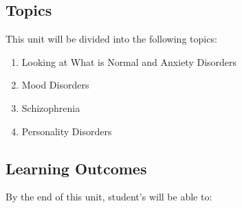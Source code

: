 \documentclass[
]{book}
\providecommand{\tightlist}{%
  \setlength{\itemsep}{0pt}\setlength{\parskip}{0pt}}
\begin{document}
\hypertarget{topics-8}{%
\subsection*{Topics}\label{topics-8}}

This unit will be divided into the following topics:

\begin{enumerate}
\def\labelenumi{\arabic{enumi}.}
\tightlist
\item
  Looking at What is Normal and Anxiety Disorders\\
\item
  Mood Disorders\\
\item
  Schizophrenia\\
\item
  Personality Disorders
\end{enumerate}

\hypertarget{learning-outcomes-8}{%
\subsection*{Learning Outcomes}\label{learning-outcomes-8}}

By the end of this unit, student's will be able to:
\end{document}
